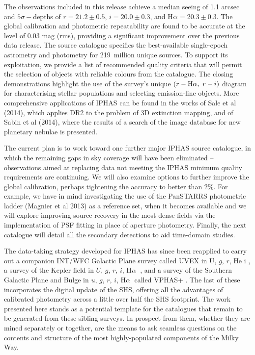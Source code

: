 \documentclass[useAMS,usenatbib]{mn2e}
\def\ha{\mbox{H$\rm \alpha$}}
\begin{document}
The observations included in this release
achieve a median seeing of 1.1 arcsec
and $5\sigma-$depths of $r=21.2\pm 0.5$, $i=20.0\pm 0.3$, and \ha$=20.3\pm 0.3$.
The global calibration and photometric repeatability
are found to be accurate at the level of $0.03$ mag (rms),
providing a significant improvement over the 
previous data release.
The source catalogue specifies the best-available
single-epoch astrometry and photometry
for 219~million unique sources.
To support its exploitation, we provide a list of recommended quality criteria
that will permit the selection of objects with reliable colours from 
the catalogue.  The closing demonstrations highlight the use of the 
survey's unique $(r-\ha,\ r-i)$ diagram for characterising stellar populations
and selecting emission-line objects.  More comprehensive applications of IPHAS
can be found in the works of Sale et al (2014), which applies DR2 to the problem
of 3D extinction mapping, and of Sabin et al (2014), where the results of a search
of the image database for new planetary nebulae is presented. 

The current plan is to work toward one further major IPHAS source catalogue, in which 
the remaining gaps in sky coverage will have been eliminated -- observations aimed at 
replacing data not meeting the IPHAS minimum quality requirements are continuing.  We will also 
examine options to further improve the global calibration, perhaps tightening the accuracy to
better than 2\%.  For example, we have in mind investigating the use of the PanSTARRS photometric 
ladder (Magnier et al 2013) as a reference set, when it becomes available and we will 
explore improving source recovery in 
the most dense fields via the implementation of PSF fitting in place of aperture photometry.  
Finally, the next catalogue will detail all the secondary detections to aid time-domain 
studies.

The data-taking strategy developed for IPHAS
has since been reapplied to carry out 
a companion INT/WFC Galactic Plane survey called UVEX
in U, $g$, $r$, He {\sc i} \citep{Groot2009},
a survey of the Kepler field 
in $U$, $g$, $r$, $i$, \ha\ 
\citep{Greiss2012},
and a survey of the Southern Galactic Plane and Bulge
in $u$, $g$, $r$, $i$, \ha\ 
called VPHAS+ \citep{Drew2014}.  The last of these incorporates the
digital update of the SHS, offering all the advantages of calibrated
photometry across a little over half the SHS footprint.  
The work presented here
stands as a potential template for the catalogues that
remain to be generated from these sibling surveys.  
In prospect from them, whether they are mined separately or together,
are the means to ask seamless questions on the contents and structure of 
the most highly-populated components of the Milky Way.  
\end{document}
